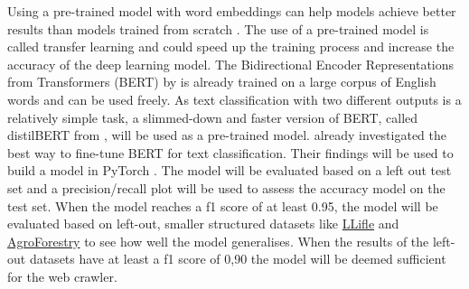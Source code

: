 \documentclass[a4paper, 12pt, oneside]{book} %
\begin{document}
Using a pre-trained model with word embeddings can help models achieve better results than models trained from scratch \autocite{mikolov_distributed_2013}.
The use of a pre-trained model is called transfer learning and could speed up the training process and increase the accuracy of the deep learning model.
The Bidirectional Encoder Representations from Transformers (BERT) by \textcite{devlin_bert_2019} is already trained on a large corpus of English words and can be used freely.
As text classification with two different outputs is a relatively simple task, a slimmed-down and faster version of BERT, called distilBERT from \textcite{sanh_distilbert_2020}, will be used as a pre-trained model.
\textcite{sun_how_2020} already investigated the best way to fine-tune BERT for text classification. 
Their findings will be used to build a model in PyTorch \autocite{paszke_pytorch_2019}.
The model will be evaluated based on a left out test set and a precision/recall plot will be used to assess the accuracy model on the test set. 
When the model reaches a f1 score of at least 0.95, the model will be evaluated based on left-out, smaller structured datasets like \href{http://www.llifle.com/}{LLifle} and \href{https://www.worldagroforestry.org/}{AgroForestry} to see how well the model generalises.
When the results of the left-out datasets have at least a f1 score of 0,90 the model will be deemed sufficient for the web crawler.
\end{document}
